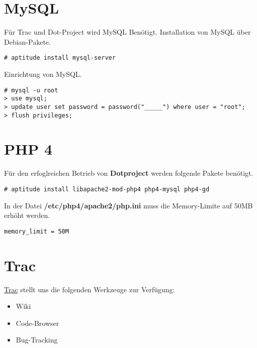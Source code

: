 \documentclass[12pt,halfparskip]{scrreprt}
\begin{document}

\section{MySQL} %
\label{sec:mysql}

Für Trac und Dot-Project wird MySQL Benötigt. Installation von MySQL über Debian-Pakete.

\begin{verbatim}
# aptitude install mysql-server
\end{verbatim}

Einrichtung von MySQL.

\begin{verbatim}
# mysql -u root
> use mysql;
> update user set password = password("_____") where user = "root";
> flush privileges;
\end{verbatim}


\section{PHP 4} %
\label{sec:php_4}

Für den erfoglreichen Betrieb von \textbf{Dotproject} werden folgende Pakete benötigt.

\begin{verbatim}
# aptitude install libapache2-mod-php4 php4-mysql php4-gd
\end{verbatim}


In der Datei \textbf{/etc/php4/apache2/php.ini} muss die Memory-Limite auf 50MB erhöht werden.

\begin{verbatim}
memory_limit = 50M  
\end{verbatim}


\section{Trac}

\href{http://trac.edgewall.org/}{Trac} stellt uns die folgenden Werkzeuge zur Verfügung:

\begin{itemize}
	\item Wiki
	\item Code-Browser
	\item Bug-Tracking
\end{itemize}
\end{document}

